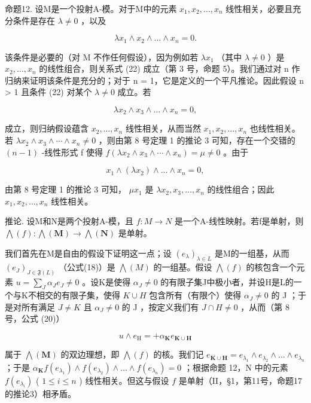 命题12. 设M是一个投射A-模。对于M中的元素 \(x_1, x_2, \ldots, x_n\) 线性相关，必要且充分条件是存在 \(\lambda \neq 0\) ，以及

\[
\lambda x _ {1} \wedge x _ {2} \wedge \dots \wedge x _ {n} = 0.\tag{22}
\]

该条件是必要的（对 M 不作任何假设），因为例如若 \(\lambda x_{1}\) （其中 \(\lambda \neq 0\) ）是 \(x_{2}, \ldots, x_{n}\) 的线性组合，则关系式 (22) 成立（第 3 号，命题 5）。我们通过对 n 作归纳来证明该条件是充分的；对于 n = 1，它是定义的一个平凡推论。因此假设 n \textgreater{} 1 且条件 (22) 对某个 \(\lambda \neq 0\) 成立。若

\[
\lambda x _ {2} \wedge x _ {3} \wedge \dots \wedge x _ {n} = 0,
\]

成立，则归纳假设蕴含 \(x_{2},\ldots,x_{n}\) 线性相关，从而当然 \(x_{1},x_{2},\ldots,x_{n}\) 也线性相关。若 \(\lambda x_{2}\wedge x_{3}\wedge\cdots\wedge x_{n}\neq0\) ，则由第 8 号定理 1 的推论 3 可知，存在一个交错的 \((n-1)\) -线性形式 f 使得 \(f(\lambda x_{2}\wedge x_{3}\wedge\cdots\wedge x_{n})=\mu\neq0\) 。由于

\[
x _ {1} \wedge (\lambda x _ {2}) \wedge \dots \wedge x _ {n} = 0,
\]

由第 8 号定理 1 的推论 3 可知， \(\mu x_{1}\) 是 \(\lambda x_{2}, x_{3}, \ldots, x_{n}\) 的线性组合；因此 \(x_{1}, x_{2}, \ldots, x_{n}\) 线性相关。

推论. 设M和N是两个投射A-模，且 \(f:M\to N\) 是一个A-线性映射。若f是单射，则 \(\bigwedge(f):\bigwedge(\mathbf{M})\to\bigwedge(\mathbf{N})\) 是单射。

我们首先在M是自由的假设下证明这一点；设 \((e_{\lambda})_{\lambda \in L}\) 是M的一组基，从而 \((e_{J})_{J \in \mathfrak{F}(L)}\) （公式(18)）是 \(\bigwedge(M)\) 的一组基。假设 \(\bigwedge(f)\) 的核包含一个元素 \(u = \sum_{J} \alpha_{J} e_{J} \neq 0\) 。设K是使得 \(\alpha_{J} \neq 0\) 的有限子集J中极小者，并设H是L的一个与K不相交的有限子集，使得 \(K \cup H\) 包含所有（有限个）使得 \(\alpha_{J} \neq 0\) 的 J ；于是对所有满足 \(J \neq K\) 且 \(\alpha_{J} \neq 0\) 的 J ，按定义我们有 \(J \cap H \neq 0\) ，从而（第 8 号，公式 (20)）

\[
u \wedge e _ {\mathrm{H}} = + \alpha_ {\mathbf {K}} e _ {\mathbf {K} \cup \mathbf {H}}
\]

属于 \(\bigwedge (\mathbf{M})\) 的双边理想，即 \(\bigwedge (f)\) 的核。我们记 \(e_{\mathbf{K} \cup \mathbf{H}} = e_{\lambda_1} \wedge e_{\lambda_2} \wedge \dots \wedge e_{\lambda_n}\) ；于是 \(\alpha_{\mathbf{K}} f(e_{\lambda_1}) \wedge f(e_{\lambda_2}) \wedge \dots \wedge f(e_{\lambda_n}) = 0\) ；根据命题 12，N 中的元素 \(f(e_{\lambda_i})\) ( \(1 \leqslant i \leqslant n\) ) 线性相关。但这与假设 \(f\) 是单射（II，§1，第11号，命题17的推论3）相矛盾。

